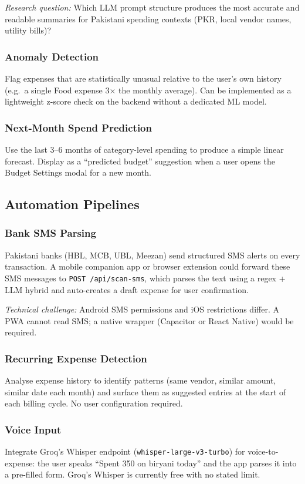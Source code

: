\documentclass[11pt,a4paper]{article}
\begin{document}
\textit{Research question:} Which LLM prompt structure produces the most
accurate and readable summaries for Pakistani spending contexts (PKR, local
vendor names, utility bills)?

\subsubsection*{Anomaly Detection}
Flag expenses that are statistically unusual relative to the user's own history
(e.g.\ a single Food expense 3$\times$ the monthly average). Can be implemented
as a lightweight z-score check on the backend without a dedicated ML model.

\subsubsection*{Next-Month Spend Prediction}
Use the last 3--6 months of category-level spending to produce a simple linear
forecast. Display as a ``predicted budget'' suggestion when a user opens the
Budget Settings modal for a new month.

\subsection{Automation Pipelines}

\subsubsection*{Bank SMS Parsing}
Pakistani banks (HBL, MCB, UBL, Meezan) send structured SMS alerts on every
transaction. A mobile companion app or browser extension could forward these
SMS messages to \texttt{POST /api/scan-sms}, which parses the text using a
regex + LLM hybrid and auto-creates a draft expense for user confirmation.

\textit{Technical challenge:} Android SMS permissions and iOS restrictions
differ. A PWA cannot read SMS; a native wrapper (Capacitor or React Native)
would be required.

\subsubsection*{Recurring Expense Detection}
Analyse expense history to identify patterns (same vendor, similar amount,
similar date each month) and surface them as suggested entries at the start of
each billing cycle. No user configuration required.

\subsubsection*{Voice Input}
Integrate Groq's Whisper endpoint (\texttt{whisper-large-v3-turbo}) for
voice-to-expense: the user speaks ``Spent 350 on biryani today'' and the app
parses it into a pre-filled form. Groq's Whisper is currently free with no
stated limit.
\end{document}

